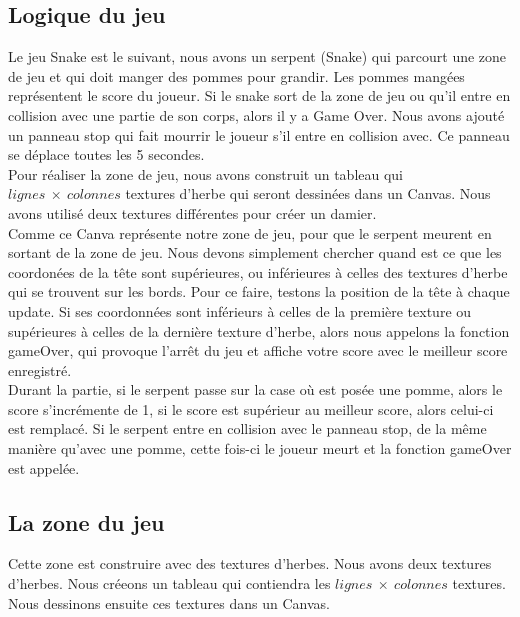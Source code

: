 \documentclass{article}
\begin{document}
\subsection{Logique du jeu}
Le jeu Snake est le suivant, nous avons un serpent (Snake) qui parcourt une zone de jeu et qui doit manger des pommes pour grandir. Les pommes mangées représentent le score du joueur. Si le snake sort de la zone de jeu ou qu'il entre en collision avec une partie de son corps, alors il y a Game Over. Nous avons ajouté un panneau stop qui fait mourrir le joueur s'il entre en collision avec. Ce panneau se déplace toutes les 5 secondes.\\
Pour réaliser la zone de jeu, nous avons construit un tableau qui $lignes~\times~colonnes$ textures d'herbe qui seront dessinées dans un Canvas. Nous avons utilisé deux textures différentes pour créer un damier.\\
Comme ce Canva représente notre zone de jeu, pour que le serpent meurent en sortant de la zone de jeu. Nous devons simplement chercher quand est ce que les coordonées de la tête sont supérieures, ou inférieures à celles des textures d'herbe qui se trouvent sur les bords. Pour ce faire, testons la position de la tête à chaque update. Si ses coordonnées sont inférieurs à celles de la première texture ou supérieures à celles de la dernière texture d'herbe, alors nous appelons la fonction gameOver, qui provoque l'arrêt du jeu et affiche votre score avec le meilleur score enregistré.\\
Durant la partie, si le serpent passe sur la case où est posée une pomme, alors le score s'incrémente de 1, si le score est supérieur au meilleur score, alors celui-ci est remplacé. Si le serpent entre en collision avec le panneau stop, de la même manière qu'avec une pomme, cette fois-ci le joueur meurt et la fonction gameOver est appelée.

\newpage

\subsection{La zone du jeu}
Cette zone est construire avec des textures d'herbes. Nous avons deux textures d'herbes. Nous créeons un tableau qui contiendra les $lignes~\times~colonnes$ textures. Nous dessinons ensuite ces textures dans un Canvas.
\end{document}
